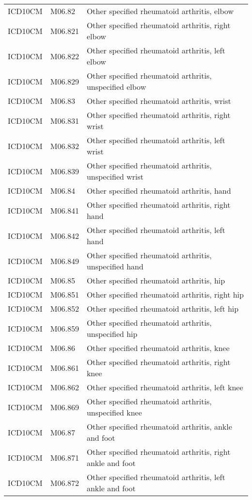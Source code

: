 \begin{longtable}{p{}p{}p{}}
  ICD10CM & M06.82 & Other specified rheumatoid arthritis, elbow \\ 
  ICD10CM & M06.821 & Other specified rheumatoid arthritis, right elbow \\ 
  ICD10CM & M06.822 & Other specified rheumatoid arthritis, left elbow \\ 
  ICD10CM & M06.829 & Other specified rheumatoid arthritis, unspecified elbow \\ 
  ICD10CM & M06.83 & Other specified rheumatoid arthritis, wrist \\ 
  ICD10CM & M06.831 & Other specified rheumatoid arthritis, right wrist \\ 
  ICD10CM & M06.832 & Other specified rheumatoid arthritis, left wrist \\ 
  ICD10CM & M06.839 & Other specified rheumatoid arthritis, unspecified wrist \\ 
  ICD10CM & M06.84 & Other specified rheumatoid arthritis, hand \\ 
  ICD10CM & M06.841 & Other specified rheumatoid arthritis, right hand \\ 
  ICD10CM & M06.842 & Other specified rheumatoid arthritis, left hand \\ 
  ICD10CM & M06.849 & Other specified rheumatoid arthritis, unspecified hand \\ 
  ICD10CM & M06.85 & Other specified rheumatoid arthritis, hip \\ 
  ICD10CM & M06.851 & Other specified rheumatoid arthritis, right hip \\ 
  ICD10CM & M06.852 & Other specified rheumatoid arthritis, left hip \\ 
  ICD10CM & M06.859 & Other specified rheumatoid arthritis, unspecified hip \\ 
  ICD10CM & M06.86 & Other specified rheumatoid arthritis, knee \\ 
  ICD10CM & M06.861 & Other specified rheumatoid arthritis, right knee \\ 
  ICD10CM & M06.862 & Other specified rheumatoid arthritis, left knee \\ 
  ICD10CM & M06.869 & Other specified rheumatoid arthritis, unspecified knee \\ 
  ICD10CM & M06.87 & Other specified rheumatoid arthritis, ankle and foot \\ 
  ICD10CM & M06.871 & Other specified rheumatoid arthritis, right ankle and foot \\ 
  ICD10CM & M06.872 & Other specified rheumatoid arthritis, left ankle and foot \\ 

\end{longtable}
